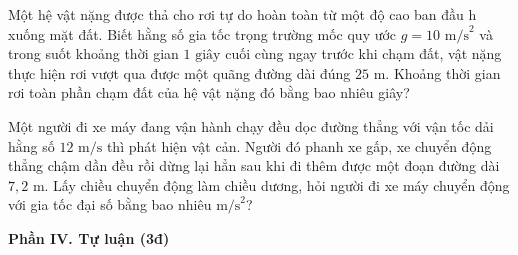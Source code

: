 \begin{ex}%
	Một hệ vật nặng được thả cho rơi tự do hoàn toàn từ một độ cao ban đầu h xuống mặt đất. Biết hằng số gia tốc trọng trường mốc quy ước $g = 10\text{ m/s}^2$ và trong suốt khoảng thời gian $1\text{ giây}$ cuối cùng ngay trước khi chạm đất, vật nặng thực hiện rơi vượt qua được một quãng đường dài đúng $25\text{ m}$. Khoảng thời gian rơi toàn phần chạm đất của hệ vật nặng đó bằng bao nhiêu giây?
\end{ex}

\begin{ex}%
	Một người đi xe máy đang vận hành chạy đều dọc đường thẳng với vận tốc dải hằng số $12\text{ m/s}$ thì phát hiện vật cản. Người đó phanh xe gấp, xe chuyển động thẳng chậm dần đều rồi dừng lại hẳn sau khi đi thêm được một đoạn đường dài $7,2\text{ m}$. Lấy chiều chuyển động làm chiều dương, hỏi người đi xe máy chuyển động với gia tốc đại số bằng bao nhiêu $\text{m/s}^2$?
\end{ex}


\noindent \textbf{Phần IV. Tự luận (3đ)}
\vspace{0.2cm}

